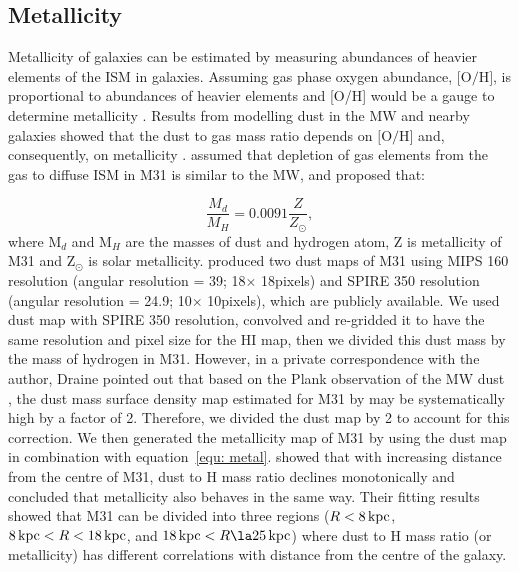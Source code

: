 \documentclass[useAMS,usenatbib]{mn2e}
\newcommand \kpc        {\,{\rm kpc}}
\begin{document}
\subsection{Metallicity}
\label{sec:metal}
 
Metallicity of galaxies can be estimated by measuring abundances of heavier elements of the ISM in galaxies. Assuming gas phase oxygen abundance, $[$O$/$H$]$, is proportional to abundances of heavier elements and [O/H] would be a gauge to determine metallicity \citep[e.g.][]{McGaugh91, Zaritsky94}. Results from modelling dust in the MW and nearby galaxies showed that the dust to gas mass ratio depends on $[$O$/$H$]$ and, consequently, on metallicity \cite{Draine07}. \cite{Draine14} assumed that depletion of gas elements from the gas to diffuse ISM in M31 is similar to the MW, and proposed that: 

 \begin{equation*}
 \label{equ: metal}
\frac{M_d}{M_H}=0.0091 \frac{Z}{Z_{\odot}},
 \end{equation*} 
 \noindent where M$_d$ and M$_H$ are the masses of dust and hydrogen atom, Z is metallicity of M31 and Z$_{\odot}$ is solar metallicity. \cite{Draine14} produced two dust maps of M31 using MIPS 160 resolution (angular resolution = 39\arcsec; 18\arcsec $\times$ 18\arcsec pixels) and SPIRE 350 resolution (angular resolution = 24\arcsec.9; 10\arcsec $\times$ 10\arcsec pixels), which are publicly available. We used dust map with SPIRE 350 resolution, convolved and re-gridded it to have the same resolution and pixel size for the HI map, then we divided this dust mass by the mass of hydrogen in M31. However, in a private correspondence with the author, Draine pointed out that based on the Plank observation of the MW dust \cite{Tauber10}, the dust mass surface density map estimated for M31 by \cite{Draine14} may be systematically high by a factor of 2. Therefore, we divided the dust map by 2 to account for this correction. We then generated the metallicity map of M31 by using the dust map in combination with equation~\ref{equ: metal}. \cite{Draine14} showed that with increasing distance from the centre of M31, dust to H mass ratio declines monotonically and concluded that metallicity also behaves in the same way. Their fitting results showed that M31 can be divided into three regions ($R< 8\kpc$, $8\kpc < R < 18\kpc$, and $18\kpc < R \la 25\kpc$) where dust to H mass ratio (or metallicity) has different correlations with distance from the centre of the galaxy.
  
\end{document}

